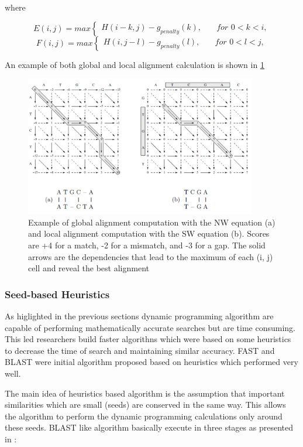 \documentclass[12pt,twoside]{article}
\begin{document}
where

\[
E(i,j) = max \begin{cases} H(i - k, j) - g_{penalty}(k), & \quad for \,\, 0 < k < i, \end{cases} 
\]
\[
F(i,j) = max \begin{cases} H(i,j - l) - g_{penalty}(l), & \quad for \,\, 0 < l < j, \end{cases}
\]

An example of both global and local alignment calculation is shown in \cref{fig:alignexample}
\begin{figure}%
    \centering
    \includegraphics[width=0.9\textwidth]{fig/alignexample}
    \caption{Example of global alignment computation with the NW equation (a) and
	local alignment computation with the SW equation (b). Scores are +4 for a match,
	-2 for a mismatch, and -3 for a gap. The solid arrows are the dependencies that
	lead to the maximum of each (i, j) cell and reveal the best alignment \cite[Figure 8.4]{gokhale_reconfigurable_2010}}
    \label{fig:alignexample}
\end{figure}

\subsubsection{Seed-based Heuristics}

As higlighted in the previous sections dynamic programming algorithm are capable of performing mathematically accurate 
searches but are time consuming. This led researchers build faster algorithns which were based on some heuristics
to decrease the time of search and maintaining similar accuracy. FAST \cite{pearson_improved_1988} and BLAST \cite{altschul_basic_1990}
were initial algorithm proposed based on heuristics which performed very well.

The main idea of heuristics based algorithm is the assumption that important similarities which are small (seeds) are conserved in the same
way. This allows the algorithm to perform the dynamic programming calculations only around these seeds. BLAST like algorithm basically
execute in three stages as presented in \cite{gokhale_reconfigurable_2010}:
\end{document}
